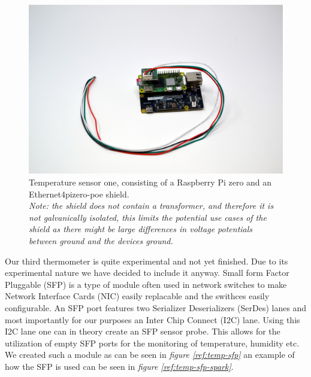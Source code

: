 \documentclass[12pt]{article}
\begin{document}
\begin{figure}
  \centering
  \includegraphics[width=\textwidth]{temp-sensor-one.JPG}
  \caption{Temperature sensor one, consisting of a Raspberry Pi zero and an Ethernet4pizero-poe shield. \\ 
  \textit{Note: the shield does not contain a transformer, and therefore it is 
  not galvanically isolated, this limits the potential use cases of the shield as there might be 
  large differences in voltage potentials between ground and the devices ground.}}
  \label{ref:temp-one}
\end{figure}

Our third thermometer is quite experimental and not yet finished.
Due to its experimental nature we have decided to include it anyway. 
Small form Factor Pluggable (SFP) is a type of module often used in network switches to 
make Network Interface Cards (NIC) easily replacable and the swithces easily configurable. 
An SFP port features two Serializer Deserializers (SerDes) lanes and most importantly for our purposes 
an Inter Chip Connect (I2C) lane. Using this I2C lane one can in theory create an SFP sensor probe. 
This allows for the utilization of empty SFP ports for the monitoring of temperature, humidity etc. 
We created such a module as can be seen in \textit{figure \ref{ref:temp-sfp}} an example of how the SFP is used 
can be seen in \textit{figure \ref{ref:temp-sfp-spark}}.
\end{document}
